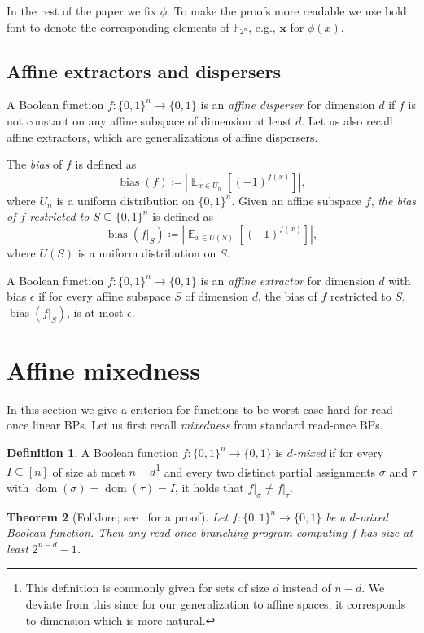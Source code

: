 \documentclass[a4paper,11pt,draft]{article}
\newtheorem{theorem}{Theorem}
\theoremstyle{definition}
\newtheorem{definition}[theorem]{Definition}
\theoremstyle{remark}
\DeclareMathOperator{\dom}{dom}
\DeclareMathOperator{\bias}{bias}
\DeclareMathOperator{\E}{\mathbb{E}}
\newcommand{\card}[1]{{\left|#1\right|}}
\newcommand{\iso}[1]{\mathbf{#1}}
\newcommand{\Q}{{\{0,1\}}}
\newcommand{\bbF}{\mathbb{F}}
\newcommand{\restr}[2]{\left.#1\right|_{#2}}
\newcommand{\readonce}{read-once}
\begin{document}
In the rest of the paper we fix $\phi$. To make the proofs more readable we use bold font to denote the corresponding elements of $\bbF_{2^n}$, e.g., $\iso{x}$ for $\phi(x)$.

\subsection{Affine extractors and dispersers}
A Boolean function $f\colon \Q^n \to \Q$ is an \emph{affine disperser} for dimension $d$ if $f$ is not constant on any affine subspace of dimension at least $d$.
Let us also recall affine extractors, which are generalizations of affine dispersers.

The \emph{bias} of $f$ is defined as
\[
  \bias(f) \coloneqq \card{\E_{x \in U_n}[(-1)^{f(x)}]},
\]
where $U_n$ is a uniform distribution on $\Q^n$.
Given an affine subspace $f$, \emph{the bias of $f$ restricted to $S \subseteq \Q^n$} is defined as
\[
  \bias(\restr{f}{S}) \coloneqq \card{\E_{x \in U(S)}[(-1)^{f(x)}]},
\]
where $U(S)$ is a uniform distribution on $S$.

A Boolean function $f\colon \Q^n \to \Q$ is an \emph{affine extractor} for dimension $d$ with bias $\epsilon$ if for every affine subspace $S$ of dimension $d$, the bias of $f$ restricted to $S$, $\bias(\restr{f}{S})$, is at most $\epsilon$.

\section{Affine mixedness}

In this section we give a criterion for functions to be worst-case hard for \readonce{} linear BPs. Let us first recall \emph{mixedness} from standard read-once BPs.

\begin{definition}
  A Boolean function $f\colon \Q^n \to \Q$ is \emph{$d$-mixed} if for every $I \subseteq [n]$ of size at most $n-d$\footnote{This definition is commonly given for sets of size $d$ instead of $n - d$. We deviate from this since for our generalization to affine spaces, it corresponds to dimension which is more natural.} and every two distinct partial assignments $\sigma$ and $\tau$ with $\dom(\sigma) = \dom(\tau) = I$, it holds that $\restr{f}{\sigma} \neq \restr{f}{\tau}$.
\end{definition}

\begin{theorem}[Folklore; see~\cite{DBLP:books/daglib/0028687} for a proof]\label{thm:mixedness_1bp}
  Let $f\colon \Q^n \to \Q$ be a $d$-mixed Boolean function. Then any read-once branching program computing $f$ has size at least $2^{n-d}-1$.
\end{theorem}
\end{document}

